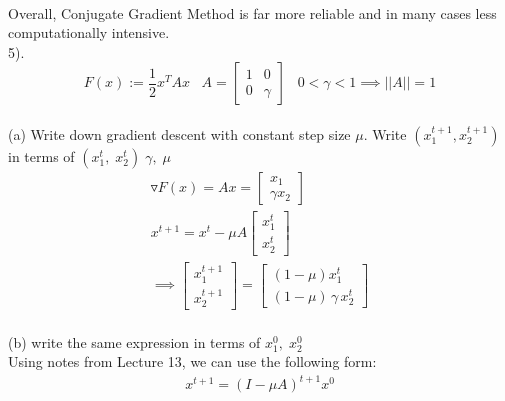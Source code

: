 \documentclass[12pt,letterpaper]{article}
\begin{document}
\vspace{10pt}
\\
Overall, Conjugate Gradient Method is far more reliable and in many cases less computationally intensive.
\vspace{10pt}
\\
5). 
\[F(x) := \frac{1}{2}x^T Ax \hspace{10pt} A = \begin{bmatrix}
1 & 0
\\ 
0 & \gamma
\end{bmatrix} \hspace{10pt} 0<\gamma<1 \implies ||A|| = 1 \]
\vspace{10pt}
\\
(a) Write down gradient descent with constant step size $\mu$. Write $(x_1^{t+1}, x_2^{t+1})$ in terms of $(x_1^t,\; x_2^t)\; \gamma,\; \mu$
\vspace{10pt}\\
\begin{equation*}
    \begin{split}
        \triangledown F(x) = Ax = \begin{bmatrix}
        x_1
        \\
        \gamma x_2
        \end{bmatrix}
        \\
        x^{t+1} = x^t -\mu A \begin{bmatrix}
        x_1^t
        \\
        x_2^t
        \end{bmatrix}
        \\
        \implies
        \begin{bmatrix}
        x_1^{t+1}
        \\
        x_2^{t+1}
        \end{bmatrix} = \begin{bmatrix}
        (1 - \mu) x_1^t
        \\
        (1 -\mu)\, \gamma\, x_2^t
        \end{bmatrix}
    \end{split}
\end{equation*}
\vspace{300pt}
\\
(b) write the same expression in terms of $x_1^0,\; x_2^0$
\vspace{10pt}\\
Using notes from Lecture 13, we can use the following form:
\begin{equation*}
    \begin{split}
        x^{t+1} = (I-\mu A)^{t+1} x^0
    \end{split}
\end{equation*}
\end{document}
